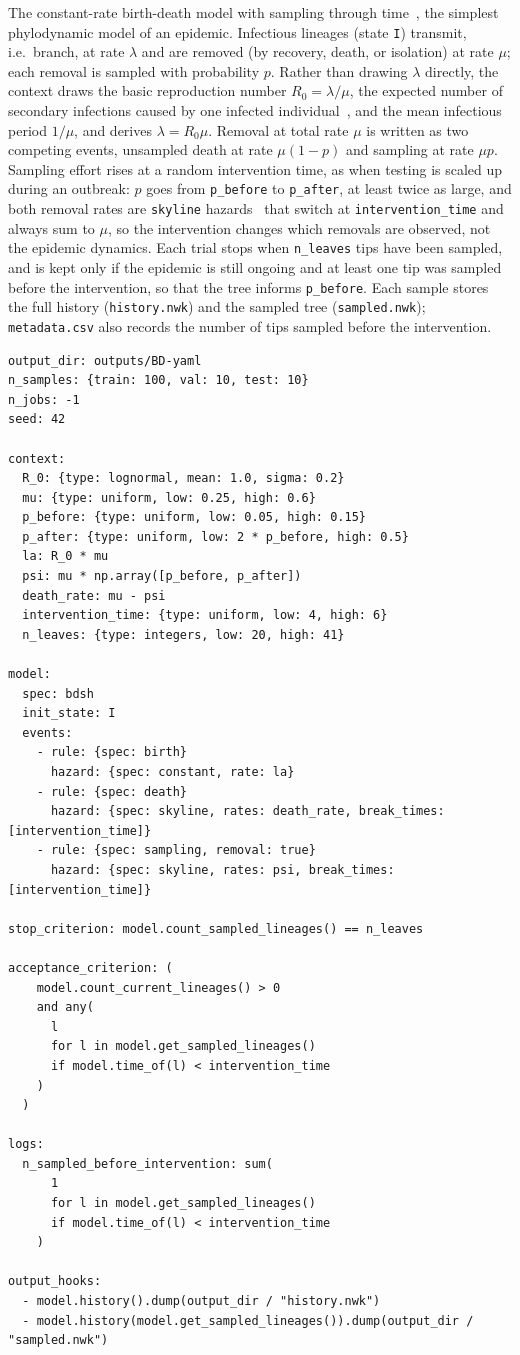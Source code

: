\documentclass[11pt]{article}
\begin{document}
The constant-rate birth-death model with sampling through
time~\citep{stadler2010sampling}, the simplest phylodynamic model of an
epidemic. Infectious lineages (state \texttt{I}) transmit, i.e.\ branch, at rate
$\lambda$ and are removed (by recovery, death, or isolation) at rate $\mu$; each
removal is sampled with probability $p$. Rather than drawing $\lambda$ directly,
the context draws the basic reproduction number $R_0 = \lambda/\mu$, the
expected number of secondary infections caused by one infected
individual~\citep{stadler2012estimating}, and the mean infectious period
$1/\mu$, and derives $\lambda = R_0\mu$. Removal at total rate $\mu$ is written
as two competing events, unsampled death at rate $\mu(1-p)$ and sampling at rate
$\mu p$. Sampling effort rises at a random intervention time, as when testing is
scaled up during an outbreak: $p$ goes from \texttt{p\_before} to
\texttt{p\_after}, at least twice as large, and both removal rates are
\texttt{skyline} hazards~\citep{stadler2013bdsky} that switch at
\texttt{intervention\_time} and always sum to $\mu$, so the intervention changes
which removals are observed, not the epidemic dynamics. Each trial stops when
\texttt{n\_leaves} tips have been sampled, and is kept only if the epidemic is
still ongoing and at least one tip was sampled before the intervention, so that
the tree informs \texttt{p\_before}. Each sample stores the full history
(\texttt{history.nwk}) and the sampled tree (\texttt{sampled.nwk});
\texttt{metadata.csv} also records the number of tips sampled before the
intervention.

\begin{lstlisting}[style=cfg]
output_dir: outputs/BD-yaml
n_samples: {train: 100, val: 10, test: 10}
n_jobs: -1
seed: 42

context:
  R_0: {type: lognormal, mean: 1.0, sigma: 0.2}
  mu: {type: uniform, low: 0.25, high: 0.6}
  p_before: {type: uniform, low: 0.05, high: 0.15}
  p_after: {type: uniform, low: 2 * p_before, high: 0.5}
  la: R_0 * mu
  psi: mu * np.array([p_before, p_after])
  death_rate: mu - psi
  intervention_time: {type: uniform, low: 4, high: 6}
  n_leaves: {type: integers, low: 20, high: 41}

model:
  spec: bdsh
  init_state: I
  events:
    - rule: {spec: birth}
      hazard: {spec: constant, rate: la}
    - rule: {spec: death}
      hazard: {spec: skyline, rates: death_rate, break_times: [intervention_time]}
    - rule: {spec: sampling, removal: true}
      hazard: {spec: skyline, rates: psi, break_times: [intervention_time]}

stop_criterion: model.count_sampled_lineages() == n_leaves

acceptance_criterion: (
    model.count_current_lineages() > 0
    and any(
      l
      for l in model.get_sampled_lineages()
      if model.time_of(l) < intervention_time
    )
  )

logs:
  n_sampled_before_intervention: sum(
      1
      for l in model.get_sampled_lineages()
      if model.time_of(l) < intervention_time
    )

output_hooks:
  - model.history().dump(output_dir / "history.nwk")
  - model.history(model.get_sampled_lineages()).dump(output_dir / "sampled.nwk")
\end{lstlisting}
\end{document}
